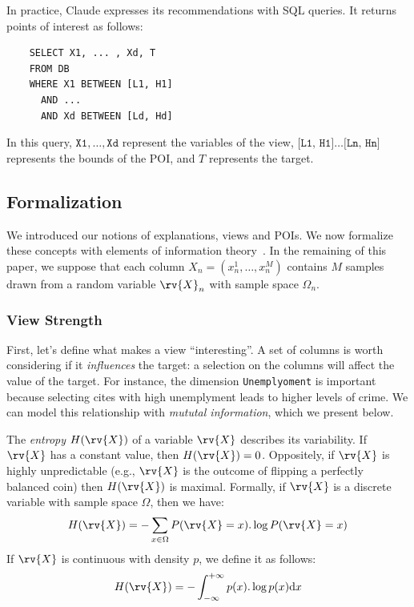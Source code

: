 In practice, Claude expresses its recommendations with SQL queries. It returns
points of interest as follows:
\begin{verbatim}
    SELECT X1, ... , Xd, T
    FROM DB
    WHERE X1 BETWEEN [L1, H1]
      AND ... 
      AND Xd BETWEEN [Ld, Hd]
\end{verbatim}
In this query, $\texttt{X1},\ldots, \texttt{Xd}$ represent the variables of the
view, $\texttt{[L1, H1]}\ldots\texttt{[Ln, Hn]}$ represents the bounds of the
POI, and $T$ represents the target.

\subsection{Formalization}
\label{sec:formalization}
We introduced our notions of explanations, views and POIs. We now formalize
these concepts with elements of information theory~\cite{cover2012elements}. In
the remaining of this paper, we suppose that each column $X_n = (x_n^1, \ldots,
x_n^M)$ contains $M$ samples drawn from a random variable $\rv{X}_n$ with
sample space $\Omega_n$.

\subsubsection{View Strength}
\label{sec:view-strength}
First, let's define what makes a view ``interesting''. A set of columns is
worth considering if it \emph{influences} the target: a selection on
the columns will affect the value of the target. For instance, the dimension
\texttt{Unemplyoment} is important because selecting cites with high
unemplyment leads to higher levels of crime. We can model this relationship
with \emph{mututal information}, which we present below.

The \emph{entropy} $H(\rv{X})$ of a variable $\rv{X}$ describes its
variability. If $\rv{X}$ has a constant value, then $H(\rv{X}) = 0$.
Oppositely, if $\rv{X}$ is highly unpredictable (e.g., $\rv{X}$ is
the outcome of flipping a perfectly balanced coin) then $H(\rv{X})$ is
maximal. Formally, if $\rv{X}$ is a discrete variable with sample space
$\Omega$, then we have:
\begin{equation}\label{eq:ent-disc}
    H(\rv{X}) = - \sum_{x\in \Omega} P(\rv{X} = x).\log{P(\rv{X} = x)}
\end{equation}
If $\rv{X}$ is continuous with density $p$, we define it as follows:
\begin{equation}\label{eq:ent-cont}
    H(\rv{X}) = - \int_{-\infty}^{+\infty} p(x).\log{p(x)}\mathrm{d}x
\end{equation}

